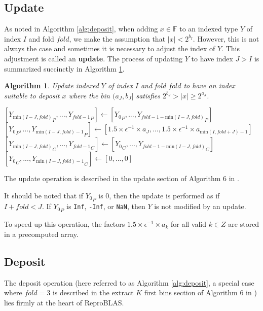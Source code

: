 \documentclass[12pt]{article}
\providecommand{\F}{\ensuremath{\mathbb{F}}}
\providecommand{\min}{\ensuremath{\text{min}}}
\theoremstyle{plain}
\newtheorem{alg}{Algorithm}[section]
\begin{document}
  \subsection{Update}
    As noted in Algorithm \ref{alg:deposit}, when adding $x \in \F$ to an indexed type $Y$ of index $I$ and fold $fold$, we make the assumption that $|x| < 2^{b_I}$. However, this is not always the case and sometimes it is necessary to adjust the index of $Y$. This adjustment is called an \textbf{update}. The process of updating $Y$ to have index $J > I$ is summarized succinctly in Algorithm \ref{alg:update}.
    \begin{alg}
      Update indexed $Y$ of index $I$ and fold $fold$ to have an index suitable to deposit $x$ where the bin $(a_{J}, b_{J}]$ satisfies $2^{b_{J}} > |x| \geq 2^{a_{J}}$.
      \begin{algorithmic}
            \State $[{Y_{\min(I - J, fold)}}_P, ..., {Y_{fold - 1}}_P] \gets [{Y_0}_P, ..., {Y_{fold - 1 - \min(I - J, fold)}}_P]$
            \State $[{Y_0}_P, ..., {Y_{\min(I - J, fold) - 1}}_P] \gets [1.5 \times \epsilon^{-1} \times a_{J}, ..., 1.5 \times \epsilon^{-1} \times a_{\min(I, fold + J) - 1}]$
            \State $[{Y_{\min(I - J, fold)}}_C, ..., {Y_{fold - 1}}_C] \gets [{Y_0}_C, ..., {Y_{fold - 1 - \min(I - J, fold)}}_C]$
            \State $[{Y_0}_C, ..., {Y_{\min(I - J, fold) - 1}}_C] \gets [0, ..., 0]$
          \EndIf
        \EndFunction
      \end{algorithmic}
      \label{alg:update}
    \end{alg}
    The update operation is described in the update section of Algorithm $6$ in \cite{repsum}.

    It should be noted that if ${Y_0}_P$ is 0, then the update is performed as if $I + fold < J$. If ${Y_0}_P$ is \verb|Inf|, \verb|-Inf|, or \verb|NaN|, then $Y$ is not modified by an update.

    To speed up this operation, the factors $1.5 \times \epsilon^{-1} \times a_k$ for all valid $k \in Z$ are stored in a precomputed array.

  \subsection{Deposit}
    The deposit operation (here referred to as Algorithm \ref{alg:deposit}, a special case where $fold = 3$ is described in the extract $K$ first bins section of Algorithm $6$ in \cite{repsum}) lies firmly at the heart of ReproBLAS.
\end{document}
